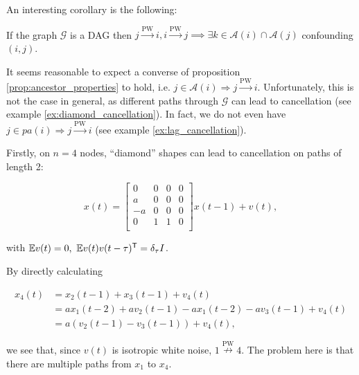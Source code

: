 \documentclass[12pt]{article}
\def\pwgc{\overset{\text{PW}}{\rightarrow}}  %
\def\npwgc{\overset{\text{PW}}{\nrightarrow}}  %
\def\gcg{\mathcal{G}}  %
\newcommand{\pa}[1]{pa(#1)}  %
\newcommand{\anc}[1]{\mathcal{A}(#1)}  %
\begin{document}
An interesting corollary is the following:

\begin{corollary}
  If the graph $\gcg$ is a DAG then $j \pwgc i, i \pwgc j \implies \exists k \in \anc{i} \cap \anc{j}$ confounding $(i, j)$.
\end{corollary}

It seems reasonable to expect a converse of proposition
\ref{prop:ancestor_properties} to hold, i.e.
$j \in \anc{i} \Rightarrow j \pwgc i$.  Unfortunately, this is not the
case in general, as different paths through $\gcg$ can lead to
cancellation (see example \ref{ex:diamond_cancellation}).  In fact, we
do not even have $j \in \pa{i} \Rightarrow j \pwgc i$ (see example
\ref{ex:lag_cancellation}).

\begin{example}
  \label{ex:diamond_cancellation}
  Firstly, on $n = 4$ nodes, ``diamond'' shapes can lead to cancellation on paths of length 2:

\begin{equation*}
  x(t) =
  \left[
    \begin{array}{cccc}
      0 & 0 & 0 & 0\\
      a & 0 & 0 & 0\\
      -a & 0 & 0 & 0\\
      0 & 1 & 1 & 0\\
    \end{array}
  \right] x(t - 1) + v(t),
\end{equation*}

with $\mathbb{E} v(t) = 0,\ \mathbb{E} v(t)v(t - \tau)^{\mathsf{T}} = \delta_\tau I$.

By directly calculating

\begin{align*}
  x_4(t) &= x_2(t - 1) + x_3(t - 1) + v_4(t)\\
         &= ax_1(t - 2) + av_2(t - 1) - ax_1(t - 2) -av_3(t - 1) + v_4(t)\\
         &= a(v_2(t - 1) - v_3(t - 1)) + v_4(t),
\end{align*}

we see that, since $v(t)$ is isotropic white noise, $1 \npwgc 4$.  The problem here is that there are multiple paths from $x_1$ to $x_4$.
\end{example}
\end{document}

